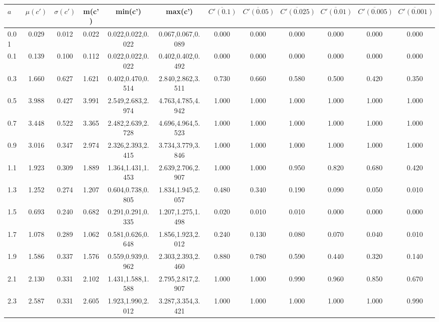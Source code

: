 \begin{table*}[h!]
\begin{center}
\begin{tabular}{| l | c | c | c | c | c | c | c | c | c | c | c |}\hline
$a$ & $\mu(c')$ & $\sigma(c')$ & m(c') & min(c') & max(c') & $\overline{C'(0.1)}$ & $\overline{C'(0.05)}$ & $\overline{C'(0.025)}$ & $\overline{C'(0.01)}$ & $\overline{C'(0.005)}$ & $\overline{C'(0.001)}$ \\\hline
0.01 & 0.029 & 0.012 & 0.022 & 0.022,0.022,0.022 & 0.067,0.067,0.089  & 0.000  & 0.000  & 0.000  & 0.000  & 0.000  & 0.000 \\\hline
0.1 & 0.139 & 0.100 & 0.112 & 0.022,0.022,0.022 & 0.402,0.402,0.492  & 0.000  & 0.000  & 0.000  & 0.000  & 0.000  & 0.000 \\\hline
0.3 & 1.660 & 0.627 & 1.621 & 0.402,0.470,0.514 & 2.840,2.862,3.511  & 0.730  & 0.660  & 0.580  & 0.500  & 0.420  & 0.350 \\\hline
0.5 & 3.988 & 0.427 & 3.991 & 2.549,2.683,2.974 & 4.763,4.785,4.942  & 1.000  & 1.000  & 1.000  & 1.000  & 1.000  & 1.000 \\\hline
0.7 & 3.448 & 0.522 & 3.365 & 2.482,2.639,2.728 & 4.696,4.964,5.523  & 1.000  & 1.000  & 1.000  & 1.000  & 1.000  & 1.000 \\\hline
0.9 & 3.016 & 0.347 & 2.974 & 2.326,2.393,2.415 & 3.734,3.779,3.846  & 1.000  & 1.000  & 1.000  & 1.000  & 1.000  & 1.000 \\\hline
1.1 & 1.923 & 0.309 & 1.889 & 1.364,1.431,1.453 & 2.639,2.706,2.907  & 1.000  & 1.000  & 0.950  & 0.820  & 0.680  & 0.420 \\\hline
1.3 & 1.252 & 0.274 & 1.207 & 0.604,0.738,0.805 & 1.834,1.945,2.057  & 0.480  & 0.340  & 0.190  & 0.090  & 0.050  & 0.010 \\\hline
1.5 & 0.693 & 0.240 & 0.682 & 0.291,0.291,0.335 & 1.207,1.275,1.498  & 0.020  & 0.010  & 0.010  & 0.000  & 0.000  & 0.000 \\\hline
1.7 & 1.078 & 0.289 & 1.062 & 0.581,0.626,0.648 & 1.856,1.923,2.012  & 0.240  & 0.130  & 0.080  & 0.070  & 0.040  & 0.010 \\\hline
1.9 & 1.586 & 0.337 & 1.576 & 0.559,0.939,0.962 & 2.303,2.393,2.460  & 0.880  & 0.780  & 0.590  & 0.440  & 0.320  & 0.140 \\\hline
2.1 & 2.130 & 0.331 & 2.102 & 1.431,1.588,1.588 & 2.795,2.817,2.907  & 1.000  & 1.000  & 0.990  & 0.960  & 0.850  & 0.670 \\\hline
2.3 & 2.587 & 0.331 & 2.605 & 1.923,1.990,2.012 & 3.287,3.354,3.421  & 1.000  & 1.000  & 1.000  & 1.000  & 1.000  & 0.990 \\\hline

\end{tabular}
\end{center}
\end{table*}
